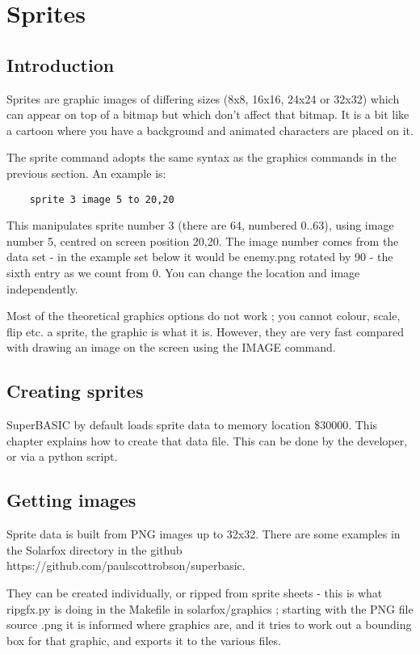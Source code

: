 \chapter{Sprites}

\section{Introduction}

Sprites are graphic images of differing sizes (8x8, 16x16, 24x24 or 32x32) which can appear on top of a bitmap but which don't affect that bitmap. It is a bit like a cartoon where you have a background and animated characters are placed on it.

The sprite command adopts the same syntax as the graphics commands in the previous section. An example is:

\begin{verbatim}
	sprite 3 image 5 to 20,20
\end{verbatim}

This manipulates sprite number 3 (there are 64, numbered 0..63), using image number 5, centred on screen position 20,20. The image number comes from the data set - in the example set below it would be enemy.png rotated by 90 - the sixth entry as we count from 0. You can change the location and image independently.

Most of the theoretical graphics options do not work ; you cannot colour, scale, flip etc. a sprite, the graphic is what it is. However, they are very fast compared with drawing an image on the screen using the IMAGE command.

\section {Creating sprites}

SuperBASIC by default loads sprite data to memory location \$30000. This chapter explains how to create that data file.  This can be done by the developer, or via a python script.

\section{Getting images}

Sprite data is built from PNG images up to 32x32. There are some examples in the Solarfox directory in the github https://github.com/paulscottrobson/superbasic.

They can be created individually, or ripped from sprite sheets - this is what ripgfx.py is doing in the Makefile in solarfox/graphics ; starting with the PNG file source .png it is informed where graphics are, and it tries to work out a bounding box for that graphic, and exports it to the various files.

